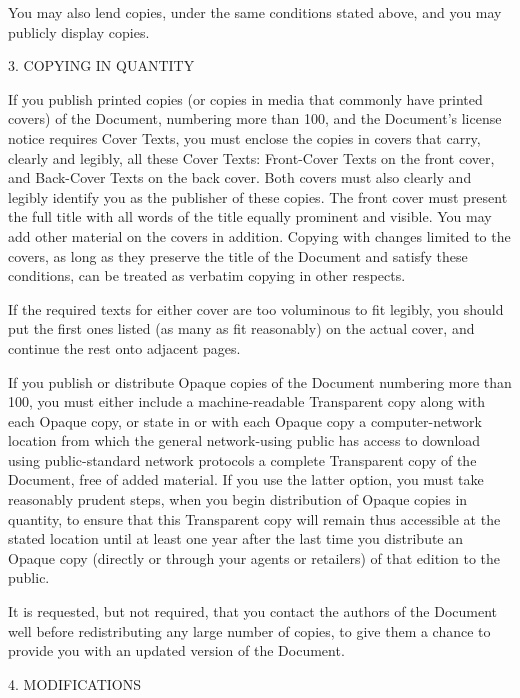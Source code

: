 \documentclass[10pt,a4paper,final]{book}
\begin{document}
{You may also lend copies, under the same conditions stated above, and
you may publicly display copies.


\begin{center}
{\Large 3. COPYING IN QUANTITY\par}
\end{center}


If you publish printed copies (or copies in media that commonly have
printed covers) of the Document, numbering more than 100, and the
Document's license notice requires Cover Texts, you must enclose the
copies in covers that carry, clearly and legibly, all these Cover
Texts: Front-Cover Texts on the front cover, and Back-Cover Texts on
the back cover.  Both covers must also clearly and legibly identify
you as the publisher of these copies.  The front cover must present
the full title with all words of the title equally prominent and
visible.  You may add other material on the covers in addition.
Copying with changes limited to the covers, as long as they preserve
the title of the Document and satisfy these conditions, can be treated
as verbatim copying in other respects.

If the required texts for either cover are too voluminous to fit
legibly, you should put the first ones listed (as many as fit
reasonably) on the actual cover, and continue the rest onto adjacent
pages.

If you publish or distribute Opaque copies of the Document numbering
more than 100, you must either include a machine-readable Transparent
copy along with each Opaque copy, or state in or with each Opaque copy
a computer-network location from which the general network-using
public has access to download using public-standard network protocols
a complete Transparent copy of the Document, free of added material.
If you use the latter option, you must take reasonably prudent steps,
when you begin distribution of Opaque copies in quantity, to ensure
that this Transparent copy will remain thus accessible at the stated
location until at least one year after the last time you distribute an
Opaque copy (directly or through your agents or retailers) of that
edition to the public.

It is requested, but not required, that you contact the authors of the
Document well before redistributing any large number of copies, to give
them a chance to provide you with an updated version of the Document.


\begin{center}
{\Large 4. MODIFICATIONS\par}
\end{center}

}
\end{document}
